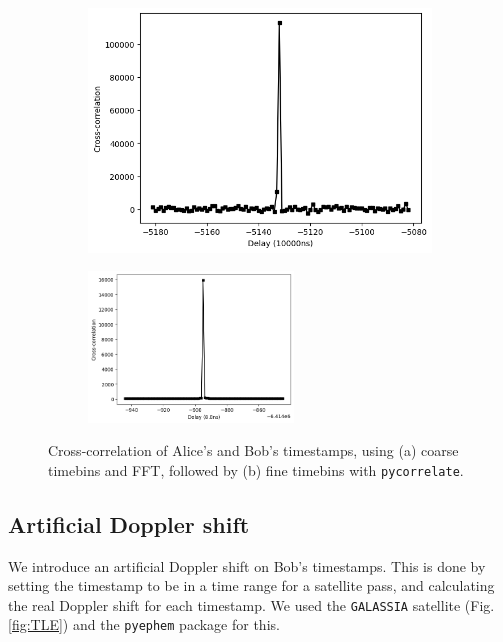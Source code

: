 \begin{figure}[ht!]
	\centering
	\begin{subfigure}[t]{0.48\linewidth}
		\centering
		\includegraphics[width=0.97\linewidth]{assets/aliceBobCoarse_cc}
		\subcaption{}
		\label{fig:cc_bin}
	\end{subfigure}
	\begin{subfigure}[t]{0.5\textwidth}
		\centering
		\includegraphics[height=4cm]{assets/aliceBob_cc.png}
		\subcaption{}
	\end{subfigure}
	\caption{Cross-correlation of Alice's and Bob's timestamps, using (a) coarse timebins and FFT, followed by (b) fine timebins with \texttt{pycorrelate}.}
	\label{fig:FFT}
\end{figure}

\subsection{Artificial Doppler shift}
We introduce an artificial Doppler shift on Bob's timestamps. This is done by setting the timestamp to be in a time range for a satellite pass, and calculating the real Doppler shift for each timestamp. We used the \texttt{GALASSIA} satellite (Fig. \ref{fig:TLE}) and the \texttt{pyephem} package for this. 

